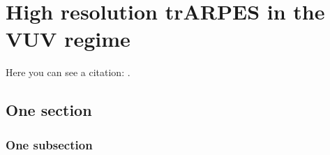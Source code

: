 \chapter{High resolution trARPES in the VUV regime}
Here you can see a citation: \cite{atc13}.

\lipsum[7]

\section{One section}

\lipsum[3]

\subsection{One subsection}

\lipsum[3]
